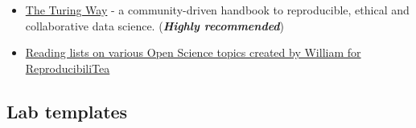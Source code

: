 \documentclass[
]{book}
\providecommand{\tightlist}{%
  \setlength{\itemsep}{0pt}\setlength{\parskip}{0pt}}
\begin{document}
\begin{itemize}
\tightlist
\item
  \href{https://the-turing-way.netlify.app/index.html}{The Turing Way} - a community-driven handbook to reproducible, ethical and collaborative data science. (\textbf{\emph{Highly recommended}})
\item
  \href{https://williamngiam.github.io/reading_lists/}{Reading lists on various Open Science topics created by William for ReproducibiliTea}
\end{itemize}

\hypertarget{lab-templates}{%
\subsection{Lab templates}\label{lab-templates}}

  
\end{document}
